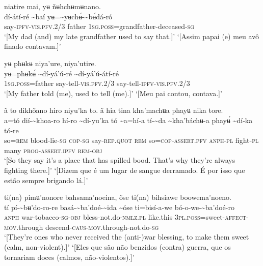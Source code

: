 \documentclass[output=paper,
modfonts,nonflat
]{langsci/langscibook}
\begin{document}
\ea niatire mai, yʉ ñʉhchʉmʉnano.  \\[.3em]
\gll {\textasciitilde}dí-átí-ré	{\textasciitilde}baí	yʉ={\textasciitilde}yʉchʉ́-{\textasciitilde}bʉ́dá-ró \\
     say\textsc{-ipfv-vis.pfv.}2/3	father	1\textsc{sg.poss}=grandfather-deceased\textsc{-sg}\\
\glt ‘[My dad (and) my late grandfather used to say that.]’
\glt ‘[Assim papai (e) meu avô
finado contavam.]’
\z

\ea yʉ phʉkʉ niya'ure, niya'utire. \\[.3em]
\gll yʉ=phʉkʉ́	{\textasciitilde}dí-yá'ú-ré	{\textasciitilde}dí-yá'ú-átí-ré \\
     1\textsc{sg.poss}=father	say-tell-\textsc{vis.pfv.}2/3	say-tell-\textsc{ipfv-vis.pfv.}2/3\\
\glt ‘[My father told (me), used to tell (me).]’
\glt ‘[Meu pai contou, contava.]’
\z 

\newpage 
\ea ã to dikhõano hiro niyu'ka to. ã hia tina kha'machʉa phayʉ nika tore. \\[.3em]
\gll {\textasciitilde}a=tó	dií-{\textasciitilde}khoa-ro	hí-ro	{\textasciitilde}dí-yu'ka{\footnotemark}	tó {\textasciitilde}a=hí-a	tí-{\textasciitilde}da	{\textasciitilde}kha'báchʉ-a	phayʉ́	{\textasciitilde}dí-ka	tó-re \\
     so=\textsc{rem}	blood-lie\textsc{-sg}	\textsc{cop-sg}	say-\textsc{rep.quot}	\textsc{rem} so=\textsc{cop-assert.pfv}	\textsc{anph-pl}	fight\textsc{-pl}	many	\textsc{prog-assert.ipfv}	\textsc{rem-obj}\\
\glt ‘[So they say it's a place that has spilled bood. That's why they're always fighting there.]’
\glt ‘[Dizem que é um lugar de sangue derramado. É por isso que estão sempre brigando lá.]’
\z 

\ea ti(na) pimʉ'nonore bahsama'noeina, õse ti(na) bihsiawe boowema'noeno. \\[.3em]
\gll tí	pí-{\textasciitilde}bʉ'do-ro-re	basá{\footnotemark}-{\textasciitilde}ba'doé-{\textasciitilde}ida {\textasciitilde}óse	ti=bisí-a-we	bó-o-we-{\textasciitilde}ba'doé-ro\\
     \textsc{anph}	war-tobacco\textsc{-sg-obj}	bless-not.do\textsc{-nmlz.pl} like.this	3\textsc{pl.poss}=sweet-\textsc{affect-mov.}through	descend-\textsc{caus-mov.}through-not.do\textsc{-sg}\\
\glt ‘[They're ones who never received the (anti-)war blessing, to make them sweet (calm, non-violent).]’
\glt ‘[Eles que são não benzidos (contra) guerra, que os tornariam doces (calmos, não-violentos).]’
\z
\end{document}
